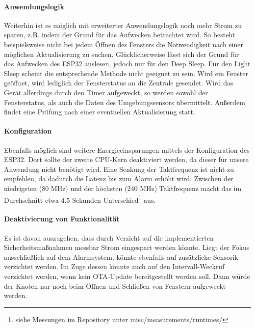 \documentclass[a4paper,10pt,twocolumn]{article}
\begin{document}
\paragraph{Anwendungslogik} Weiterhin ist es möglich mit erweiterter Anwendungslogik noch mehr Strom zu sparen, z.B. indem der Grund für das Aufwecken betrachtet wird. So besteht beispielsweise nicht bei jedem Öffnen des Fensters die Notwendigkeit nach einer möglichen Aktualisierung zu suchen. Glücklicherweise lässt sich der Grund für das Aufwecken des ESP32 auslesen, jedoch nur für den Deep Sleep. Für den Light Sleep scheint die entsprechende Methode nicht geeignet zu sein. Wird ein Fenster geöffnet, wird lediglich der Fensterstatus an die Zentrale gesendet. Wird das Gerät allerdings durch den Timer aufgeweckt, so werden sowohl der Fensterstatus, als auch die Daten des Umgebungssensors übermittelt. Außerdem findet eine Prüfung nach einer eventuellen Aktualisierung statt.
\paragraph{Konfiguration} Ebenfalls möglich sind weitere Energieeinsparungen mittels der Konfiguration des ESP32. Dort sollte der zweite CPU-Kern deaktiviert werden, da dieser für unsere Anwendung nicht benötigt wird. Eine Senkung der Taktfrequenz ist nicht zu empfehlen, da dadurch die Latenz bis zum Alarm erhöht wird. Zwischen der niedrigsten (80 MHz) und der höchsten (240 MHz) Taktfrequenz macht das im Durchschnitt etwa 4.5 Sekunden Unterschied\footnote{siehe Messungen im Repository\cite{smarthome2} unter misc/measurements/runtimes/} aus.
\paragraph{Deaktivierung von Funktionalität} Es ist davon auszugehen, dass durch Verzicht auf die implementierten Sicherheitsmaßnahmen messbar Strom eingespart werden könnte. Liegt der Fokus ausschließlich auf dem Alarmsystem, könnte ebenfalls auf zusätzliche Sensorik verzichtet werden. Im Zuge dessen könnte auch auf den Intervall-Weckruf verzichtet werden, wenn kein \ac{OTA}-Update bereitgestellt werden soll. Dann würde der Knoten nur noch beim Öffnen und Schließen von Fenstern aufgeweckt werden.
\end{document}
